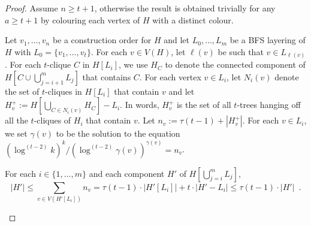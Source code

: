 \documentclass[kpfonts]{patmorin}
\theoremstyle{named}
\begin{document}
\begin{proof}
    Assume $n\ge t+1$, otherwise the result is obtained trivially for any $a\ge t+1$ by colouring each vertex of $H$ with a distinct colour.




    Let $v_1,\ldots,v_n$ be a construction order for $H$ and let $L_0,\ldots,L_m$ be a BFS layering of $H$ with $L_0=\{v_1,\ldots,v_{t}\}$.
    For each $v\in V(H)$, let $\ell(v)$ be such that $v\in L_{\ell(v)}$.
    For each $t$-clique $C$ in $H[L_i]$, we use $H_C$ to denote the connected component of $H[C\cup\bigcup_{j=i+1}^m L_j]$ that contains $C$.
    For each vertex $v\in L_i$, let $N_i(v)$ denote the set of $t$-cliques in $H[L_i]$ that contain $v$ and let $H^+_v:=H[\bigcup_{C\in N_i(v)} H_C]-L_i$.  In words, $H^+_v$ is the set of all $t$-trees hanging off all the $t$-cliques of $H_i$ that contain $v$.  Let $n_v:=\tau(t-1)+|H^+_v|$.  For each $v\in L_i$, we set $\gamma(v)$ to be the solution to the equation $(\log^{(t-2)} k)^k/(\log^{(t-2)} \gamma(v))^{\gamma(v)} = n_v$.

    \begin{clm}\label{size-claim}
        For each $i\in\{1,\ldots,m\}$ and each component $H'$ of $H[\bigcup_{j=i}^m L_j]$,
        \[
            |H'| \le \sum_{v\in V(H'[L_i])} n_v = \tau(t-1)\cdot|H'[L_i] |+ t\cdot|H'-L_i|
            \le \tau(t-1)\cdot|H'| \enspace .
        \]
    \end{clm}


\end{proof}
\end{document}
